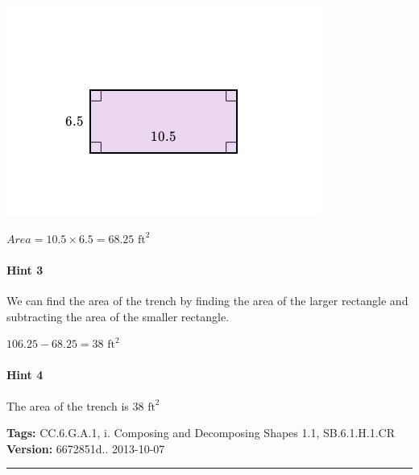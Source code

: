 \documentclass[twocolumn,10pt]{article}
\def\shrinkfactor{0.55}
\begin{document}
\includegraphics[scale=\shrinkfactor]{figures/78be3885ed943cd2905fc1ff84f83c27e0c02098.png}  

$Area=10.5\times6.5=68.25  \text{ ft}^2$  

\paragraph{Hint 3}We can find the area of the trench by finding the area of the larger rectangle and subtracting the area of the smaller rectangle. 

$106.25-68.25=38\text{ ft}^2$ 

\paragraph{Hint 4}The area of the trench is $38\text{ ft}^2$ 



\medskip
\noindent
\textbf{Tags:} {\footnotesize CC.6.G.A.1, i.	Composing and Decomposing Shapes 1.1, SB.6.1.H.1.CR}\\
\textbf{Version:} 6672851d.. 2013-10-07
\smallskip\hrule
\end{document}
